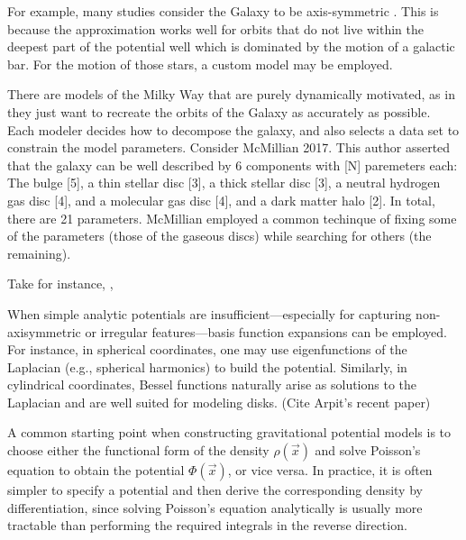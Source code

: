         For example, many studies consider the Galaxy to be axis-symmetric \citep{Ibata,McMillian,Body,Pouliasis,Besançon}. This is because the approximation works well for orbits that do not live within the deepest part of the potential well which is dominated by the motion of a galactic bar. For the motion of those stars, a custom model may be employed. 

        There are models of the Milky Way that are purely dynamically motivated, as in they just want to recreate the orbits of the Galaxy as accurately as possible. Each modeler decides how to decompose the galaxy, and also selects a data set to constrain the model parameters. Consider McMillian 2017. This author asserted that the galaxy can be well described by 6 components with [N] paremeters each: The bulge [5], a thin stellar disc [3], a thick stellar disc [3], a neutral hydrogen gas disc [4], and a molecular gas disc [4], and a dark matter halo [2]. In total, there are 21 parameters. McMillian employed a common techinque of fixing some of the parameters (those of the gaseous discs) while searching for others (the remaining). 
        



        
        Take for instance, \citep{2017MNRAS.465...76M}, 


        When simple analytic potentials are insufficient—especially for capturing non-axisymmetric or irregular features—basis function expansions can be employed. For instance, in spherical coordinates, one may use eigenfunctions of the Laplacian (e.g., spherical harmonics) to build the potential. Similarly, in cylindrical coordinates, Bessel functions naturally arise as solutions to the Laplacian and are well suited for modeling disks. (Cite Arpit's recent paper)



        A common starting point when constructing gravitational potential models is to choose either the functional form of the density $\rho(\vec{x})$ and solve Poisson's equation to obtain the potential $\Phi(\vec{x})$, or vice versa. In practice, it is often simpler to specify a potential and then derive the corresponding density by differentiation, since solving Poisson's equation analytically is usually more tractable than performing the required integrals in the reverse direction.

